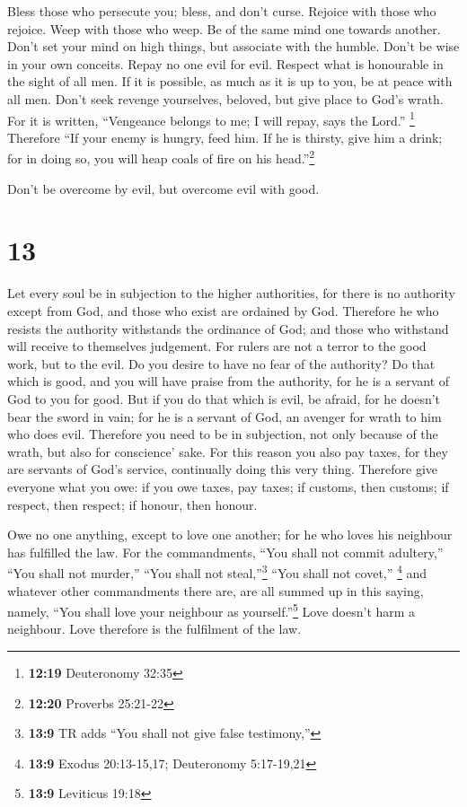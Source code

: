  Bless those who persecute you; bless, and don't curse.
 Rejoice with those who rejoice. Weep with those who
weep.  Be of the same mind one towards another. Don't set
your mind on high things, but associate with the humble. Don't be wise
in your own conceits.  Repay no one evil for evil.
Respect what is honourable in the sight of all men.  If
it is possible, as much as it is up to you, be at peace with all men.
 Don't seek revenge yourselves, beloved, but give place
to God's wrath. For it is written, ``Vengeance belongs to me; I will
repay, says the Lord.'' \footnote{\textbf{12:19} Deuteronomy 32:35}
 Therefore ``If your enemy is hungry, feed him. If he is
thirsty, give him a drink; for in doing so, you will heap coals of fire
on his head.''\footnote{\textbf{12:20} Proverbs 25:21-22}

 Don't be overcome by evil, but overcome evil with good.

\hypertarget{section-12}{%
\section{13}\label{section-12}}

 Let every soul be in subjection to the higher
authorities, for there is no authority except from God, and those who
exist are ordained by God.  Therefore he who resists the
authority withstands the ordinance of God; and those who withstand will
receive to themselves judgement.  For rulers are not a
terror to the good work, but to the evil. Do you desire to have no fear
of the authority? Do that which is good, and you will have praise from
the authority,  for he is a servant of God to you for
good. But if you do that which is evil, be afraid, for he doesn't bear
the sword in vain; for he is a servant of God, an avenger for wrath to
him who does evil.  Therefore you need to be in
subjection, not only because of the wrath, but also for conscience'
sake.  For this reason you also pay taxes, for they are
servants of God's service, continually doing this very thing.
 Therefore give everyone what you owe: if you owe taxes,
pay taxes; if customs, then customs; if respect, then respect; if
honour, then honour.

 Owe no one anything, except to love one another; for he
who loves his neighbour has fulfilled the law.  For the
commandments, ``You shall not commit adultery,'' ``You shall not
murder,'' ``You shall not steal,''\footnote{\textbf{13:9} TR adds ``You
  shall not give false testimony,''} ``You shall not covet,''
\footnote{\textbf{13:9} Exodus 20:13-15,17; Deuteronomy 5:17-19,21} and
whatever other commandments there are, are all summed up in this saying,
namely, ``You shall love your neighbour as yourself.''\footnote{\textbf{13:9}
  Leviticus 19:18}  Love doesn't harm a neighbour. Love
therefore is the fulfilment of the law.

